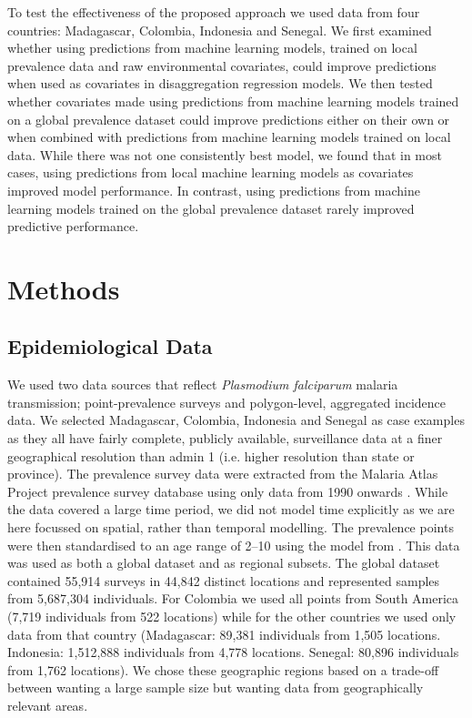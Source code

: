 \documentclass[review]{elsarticle}
\begin{document}
To test the effectiveness of the proposed approach we used data from four countries: Madagascar, Colombia, Indonesia and Senegal.
We first examined whether using predictions from machine learning models, trained on local prevalence data and raw environmental covariates, could improve predictions when used as covariates in disaggregation regression models.
We then tested whether covariates made using predictions from machine learning models trained on a global prevalence dataset could improve predictions either on their own or when combined with predictions from machine learning models trained on local data.
While there was not one consistently best model, we found that in most cases, using predictions from local machine learning models as covariates improved model performance.
In contrast, using predictions from machine learning models trained on the global prevalence dataset rarely improved predictive performance.

\section{Methods}

\subsection{Epidemiological Data}

We used two data sources that reflect \emph{Plasmodium falciparum} malaria transmission; point-prevalence surveys and polygon-level, aggregated incidence data. 
We selected Madagascar, Colombia, Indonesia and Senegal as case examples as they all have fairly complete, publicly available, surveillance data at a finer geographical resolution than admin 1 (i.e. higher resolution than state or province).
The prevalence survey data were extracted from the Malaria Atlas Project prevalence survey database using only data from 1990 onwards \citep{bhatt2015effect, guerra2007assembling, pfeffer2018ma}.
While the data covered a large time period, we did not model time explicitly as we are here focussed on spatial, rather than temporal modelling.
The prevalence points were then standardised to an age range of 2--10 using the model from \citep{smith2007standardizing}.
This data was used as both a global dataset and as regional subsets.
The global dataset contained 55,914 surveys in 44,842 distinct locations and represented samples from 5,687,304 individuals.
For Colombia we used all points from South America (7,719 individuals from 522 locations) while for the other countries we used only data from that country (Madagascar: 89,381 individuals from 1,505 locations. Indonesia: 1,512,888 individuals from 4,778 locations. Senegal: 80,896 individuals from 1,762 locations).
We chose these geographic regions based on a trade-off between wanting a large sample size but wanting data from geographically relevant areas.
\end{document}

